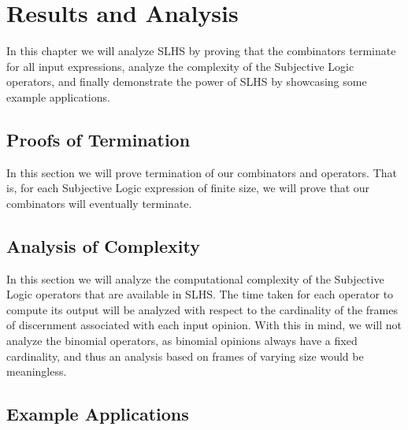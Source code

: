 \documentclass[thesis.tex]{subfiles}
\begin{document}
\chapter{Results and Analysis}
\label{chap:results-and-analysis}

In this chapter we will analyze SLHS by proving that the combinators terminate for
all input expressions, analyze the complexity of the Subjective Logic operators, and
finally demonstrate the power of SLHS by showcasing some example applications.





\section{Proofs of Termination}

In this section we will prove termination of our combinators and operators. That is,
for each Subjective Logic expression of finite size, we will prove that our combinators
will eventually terminate.





\section{Analysis of Complexity}

In this section we will analyze the computational complexity of the Subjective Logic
operators that are available in SLHS. The time taken for each operator to compute its
output will be analyzed with respect to the cardinality of the frames of discernment
associated with each input opinion. With this in mind, we will not analyze the
binomial operators, as binomial opinions always have a fixed cardinality, and thus
an analysis based on frames of varying size would be meaningless.




\section{Example Applications}
\end{document}
